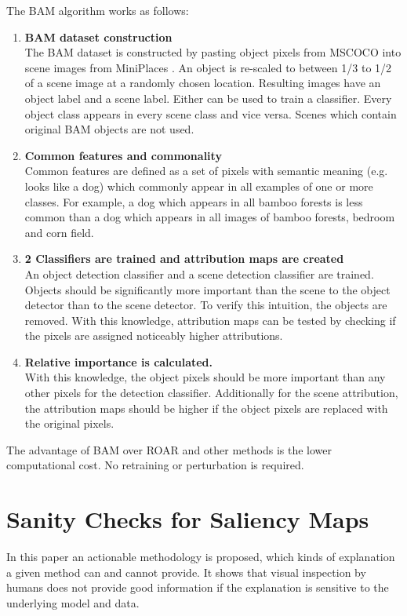 The BAM algorithm works as follows:
\begin{enumerate}
	\item \textbf{BAM dataset construction}\\
	The BAM dataset is constructed by pasting object pixels from MSCOCO \cite{lin2015microsoft} into scene images from MiniPlaces \cite{zhou2016places}. An object is re-scaled to between 1/3 to 1/2 of a scene image at a randomly chosen location. Resulting images have an object label and a scene label. Either can be used to train a classifier. Every object class appears in every scene class and vice versa. Scenes which contain original BAM objects are not used.
	\item \textbf{Common features and commonality}\\
	Common features are defined as a set of pixels with semantic meaning (e.g. looks like a dog) which commonly appear in all examples of one or more classes. For example, a dog which appears in all bamboo forests is less common than a dog  which appears in all images of bamboo forests, bedroom and corn field.
	\item \textbf{2 Classifiers are trained and attribution maps are created}\\
	An object detection classifier and a scene detection classifier are trained. Objects should be significantly more important than the scene to the object detector  than to the scene detector. To verify this intuition, the objects are removed. With this knowledge, attribution maps can be tested by checking if the pixels are assigned noticeably higher attributions.
	\item \textbf{Relative importance is calculated.}\\
	With this knowledge, the object pixels should be more important than any other pixels for the detection classifier. Additionally for the scene attribution, the attribution maps should be higher if the object pixels are replaced with the original pixels.
\end{enumerate}


The advantage of BAM over ROAR \cite{hooker2019benchmark} and other methods is the lower computational cost. No retraining or perturbation is required.


\section{Sanity Checks for Saliency Maps \cite{adebayo2020sanity}}

In this paper an actionable methodology is proposed, which kinds of explanation a given method can and cannot provide. It shows that visual inspection by humans does not provide good information if the explanation is sensitive to the underlying model and data.

